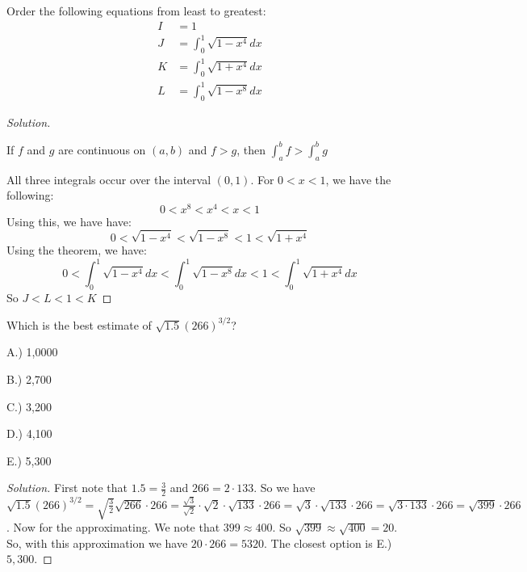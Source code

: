 \documentclass[crop=false,class=book]{standalone}
\begin{document}
        \begin{problem}
        Order the following equations from least to greatest:
        \begin{align*}
            I&=1\\
            J&=\int_{0}^{1}\sqrt{1-x^{4}}dx\\
            K&=\int_{0}^{1}\sqrt{1+x^{4}}dx\\
            L&=\int_{0}^{1}\sqrt{1-x^{8}}dx
        \end{align*}
        \end{problem}
        \begin{proof}[Solution]
        \begin{theorem*}
        If $f$ and $g$ are continuous on $(a,b)$ and $f>g$, then $\int_{a}^{b}f>\int_{a}^{b}g$
        \end{theorem*}
        All three integrals occur over the interval $(0,1)$. For $0 < x < 1$, we have the following:
        \begin{equation*}
            0<x^{8}<x^{4}<x<1
        \end{equation*}
        Using this, we have have:
        \begin{equation*}
            0<\sqrt{1-x^{4}}<\sqrt{1-x^{8}}<1<\sqrt{1+x^{4}}
        \end{equation*}
        Using the theorem, we have:
        \begin{equation*}
            0<\int_{0}^{1}\sqrt{1-x^4}dx<\int_{0}^{1}\sqrt{1-x^8}dx<1<\int_{0}^{1}\sqrt{1+x^4}dx
        \end{equation*}
        So $J<L<1<K$
        \end{proof}
        \begin{problem}
        Which is the best estimate of $\sqrt{1.5}(266)^{3/2}$?
        \begin{enumerate}
            \begin{multicols}{5}
            \item[A.)] 1,0000
            \item[B.)] 2,700
            \item[C.)] 3,200
            \item[D.)] 4,100
            \item[E.)] 5,300
            \end{multicols}
        \end{enumerate}
        \end{problem}
        \begin{proof}[Solution]
        First note that $1.5 = \frac{3}{2}$ and $266 = 2\cdot 133$. So we have $\sqrt{1.5}(266)^{3/2} = \sqrt{\frac{3}{2}}\sqrt{266}\cdot 266 = \frac{\sqrt{3}}{\sqrt{2}}\cdot \sqrt{2}\cdot \sqrt{133}\cdot 266 = \sqrt{3}\cdot \sqrt{133}\cdot 266 = \sqrt{3\cdot 133}\cdot 266 = \sqrt{399}\cdot 266$. Now for the approximating. We note that $399 \approx 400$. So $\sqrt{399} \approx \sqrt{400} = 20$. So, with this approximation we have $20\cdot 266 = 5320$. The closest option is E.) $5,300$.
        \end{proof}
\end{document}
